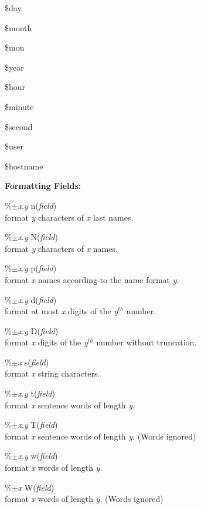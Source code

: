 \documentclass[a4paper]{article}
\newenvironment{FlatList}{\begin{list}{}{%
      \topsep=0pt\itemsep=0pt\parsep=0pt\let\makelabel=\flatlistlabel}}{\end{list}}%
\newcommand\flatlistlabel[1]{\descriptionlabel{\textsf{#1}}}
\begin{document}
\begin{multicols}{4}
\begin{FlatList}
  \item [\$day]
  \item [\$month]
  \item [\$mon]
  \item [\$year]
  \item [\$hour]
  \item [\$minute]
  \item [\$second]
  \item [\$user]
  \item [\$hostname]
  \end{FlatList}
  \textbf{Formatting Fields:} 
  \begin{FlatList}
  \item [\%$\pm ${\it x}.{\it y}\/ n({\it field}\/)]\ \\
    format {\it y}\/ characters of {\it x}\/ last names.
  \item [\%$\pm ${\it x}.{\it y}\/ N({\it field}\/)]\ \\
    format {\it y}\/ characters of {\it x}\/ names.
  \item [\%$\pm ${\it x}.{\it y}\/ p({\it field}\/)]\ \\
    format {\it x}\/ names according to the name format {\it y}.
  \item [\%$\pm ${\it x}.{\it y}\/ d({\it field}\/)]\ \\
    format at most {\it x}\/ digits of the {\it y}$^{th}$ number.
  \item [\%$\pm ${\it x}.{\it y}\/ D({\it field}\/)]\ \\
    format {\it x}\/ digits of the {\it y}$^{th}$ number without truncation.
  \item [\%$\pm ${\it x}\/ s({\it field}\/)]\ \\
    format {\it x}\/ string characters.
  \item [\%$\pm ${\it x}.{\it y}\/ t({\it field}\/)]\ \\
    format {\it x}\/ sentence words of length {\it y}.
  \item [\%$\pm ${\it x}.{\it y}\/ T({\it field}\/)]\ \\
    format {\it x}\/ sentence words  of length {\it y}. (Words ignored)
  \item [\%$\pm ${\it x}.{\it y}\/ w({\it field}\/)]\ \\
    format {\it x}\/ words of length {\it y}.
  \item [\%$\pm ${\it x}\/ W({\it field}\/)]\ \\
    format {\it x}\/ words of length {\it y}. (Words ignored)

\end{FlatList}
\end{multicols}
\end{document}
